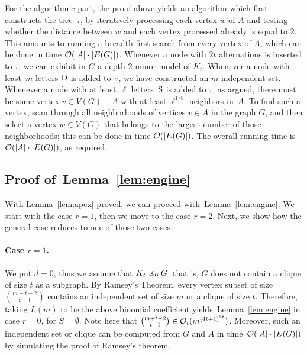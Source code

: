 For the algorithmic part, the proof above yields an algorithm which
first constructs the tree~$\tau$, by iteratively processing each
vertex $w$ of $A$ and testing whether the distance between $w$ and
each vertex processed already is equal to $2$.  This amounts to
running a breadth-first search from every vertex of $A$, which can be
done in time $\mathcal{O}(|A|\cdot |E(G)|)$.  Whenever a node with $2t$
alternations is inserted to $\tau$, we can exhibit in $G$ a depth-$2$
minor model of $K_t$.  Whenever a node with least~$m$ letters $\mathrm{D}$
is added to~$\tau$, we have constructed an $m$-independent
set. Whenever a node with at least~$\ell$ letters~$\mathrm{S}$ is added to
$\tau$, as argued, there must be some vertex $v\in V(G)-A$ with at
least $\ell^{1/8}$ neighbors in~$A$.  To find such a vertex, scan
through all neighborhoods of vertices $v\in A$ in the graph $G$, and
then select a vertex $w\in V(G)$ that belongs to the largest number of
those neighborhoods; this can be done in time $\mathcal{O}(|E(G)|)$.  The
overall running time is $\mathcal{O}(|A|\cdot |E(G)|)$, as required.


\subsection{Proof of~Lemma~\ref{lem:engine}}
\label{sec:engine}

With Lemma~\ref{lem:apex} proved, we can proceed
with~Lemma~\ref{lem:engine}.  We start with the case $r=1$, then we
move to the case $r=2$.  Next, we show how the general case reduces to
one of those two cases.

\paragraph{Case $r=1$.}
We put $d=0$, thus we assume that $K_t\not\preccurlyeq_0 G$; that is, $G$
does not contain a clique of size $t$ as a subgraph. By Ramsey's
Theorem, every vertex subset of size $\binom{m+t-2}{t-1}$ contains an
independent set of size $m$ or a clique of size $t$. Therefore, taking
$L(m)$ to be the above binomial coefficient
yields~Lemma~\ref{lem:engine} in case $r=0$, for $S=\emptyset$. Note
here that $\binom{m+t-2}{t-1}\in\mathcal{O}_{t}{(m^{{(4t+1)}^{2t}})}$.
Moreover, such an independent set or clique can be computed from $G$
and $A$ in time~$\mathcal{O}(|A|\cdot |E(G)|)$ by simulating the proof of
Ramsey's theorem.

